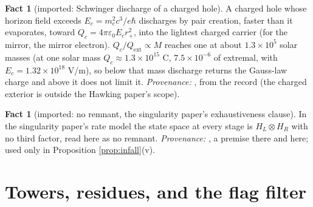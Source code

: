 \documentclass[11pt]{article}
\theoremstyle{definition}
\newtheorem{fact}[theorem]{Fact}
\let\oldsection\section
\renewcommand{\section}{\clearpage\oldsection}   %
\begin{document}
\begin{fact}[imported: Schwinger discharge of a charged hole]\label{fact:discharge}
A charged hole whose horizon field exceeds $E_{c} = m_{e}^{2}c^{3}/e\hbar$ discharges by pair creation, faster than it evaporates, toward $Q_{c} = 4\pi\varepsilon_{0}E_{c}r_{+}^{2}$, into the lightest charged carrier (for the mirror, the mirror electron). $Q_{c}/Q_{\mathrm{ext}} \propto M$ reaches one at about $1.3 \times 10^{5}$ solar masses (at one solar mass $Q_{c} \approx 1.3 \times 10^{15}$ C, $7.5 \times 10^{-6}$ of extremal, with $E_{c} = 1.32 \times 10^{18}$ V/m), so below that mass discharge returns the Gauss-law charge and above it does not limit it. \emph{Provenance:} \cite{Gibbons1975, HiscockWeems1990}, from the record (the charged exterior is outside the Hawking paper's scope).
\end{fact}

\begin{fact}[imported: no remnant, the singularity paper's exhaustiveness clause]\label{fact:noremnant}
In the singularity paper's rate model the state space at every stage is $H_{L} \otimes H_{R}$ with no third factor, read here as no remnant. \emph{Provenance:} \cite[Premise~11.3(L)]{ButlerT5}, a premise there and here; used only in Proposition \ref{prop:infall}(v).
\end{fact}

\section{Towers, residues, and the flag filter}\label{sec:towers}
\end{document}
